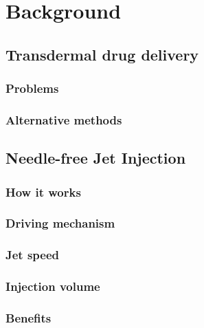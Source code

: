 \chapter{Background}                            \label{Chapter:background}


\section{Transdermal drug delivery}             \label{Chapter:background/transdermal drug delivery}
\subsection{Problems}                           \label{Chapter:background/transdermal drug delivery/problems}
\subsection{Alternative methods}                \label{Chapter:background/transdermal drug delivery/alternative methods}


\section{Needle-free Jet Injection}             \label{Chapter:background/needle-free jet injection}
\subsection{How it works}                       \label{Chapter:background/needle-free jet injection/how it works}
\subsection{Driving mechanism}                  \label{Chapter:background/needle-free jet injection/driving mechanism}
\subsection{Jet speed}                          \label{Chapter:background/needle-free jet injection/jet speed}
\subsection{Injection volume}                   \label{Chapter:background/needle-free jet injection/injection volume}
\subsection{Benefits}                           \label{Chapter:background/needle-free jet injection/benefits}
